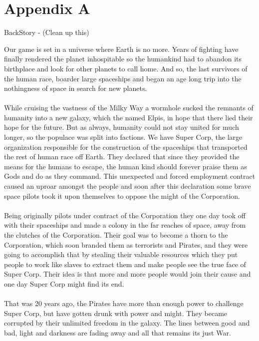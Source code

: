 \documentclass[11pt,a4paper]{article}
\begin{document}
\pagebreak
        \section{Appendix A}

        BackStory - (Clean up this)

        Our game is set in a universe where Earth is no more. Years of fighting have finally rendered the planet inhospitable so the humankind had to abandon its birthplace and look for other planets to call home. And so, the last survivors of the human race, boarder large spaceships and began an age long trip into the nothingness of space in search for new planets. \\\\
        While cruising the vastness of the Milky Way a wormhole sucked the remnants of humanity into a new galaxy, which the named Elpis, in hope that there lied their hope for the future. But as always, humanity could not stay united for much longer, so the populace was split into factions. We have Super Corp, the large organization responsible for the construction of the spaceships that transported the rest of human race off Earth. They declared that since they provided the means for the humans to escape, the human kind should forever praise them as Gods and do as they command. This unexpected and forced employment contract caused an uproar amongst the people and soon after this declaration some brave space pilots took it upon themselves to oppose the might of the Corporation. \\\\

        Being originally pilots under contract of the Corporation they one day took off with their spaceships and made a colony in the far reaches of space, away from the clutches of the Corporation. Their goal was to become a thorn to the Corporation, which soon branded them as terrorists and Pirates, and they were going to accomplish that by stealing their valuable resources which they put people to work like slaves to extract them and make people see the true face of Super Corp. Their idea is that more and more people would join their cause and one day Super Corp might find its end.
        \\ \\

        That was 20 years ago, the Pirates have more than enough power to challenge Super Corp, but have gotten drunk with power and might. They became corrupted by their unlimited freedom in the galaxy. The lines between good and bad, light and darkness are fading away and all that remains its just War.
\end{document}
